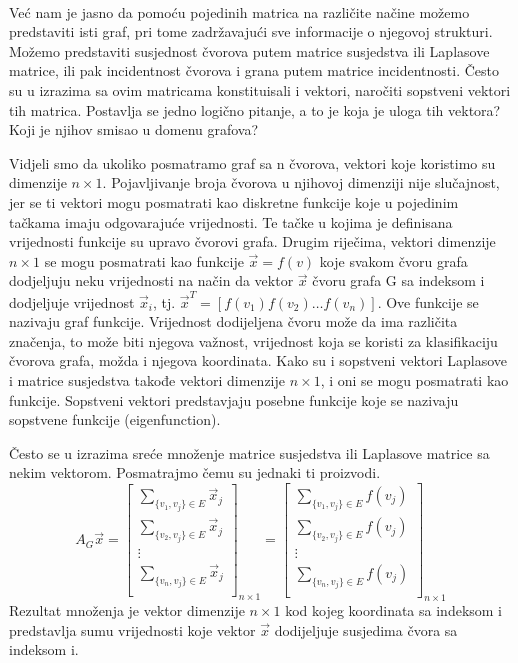 \documentclass[11pt]{article}
\begin{document}
	\paragraph{}
	Već nam je jasno da pomoću pojedinih matrica na različite načine možemo predstaviti isti graf, pri tome zadržavajući sve informacije o njegovoj strukturi. 
    Možemo predstaviti susjednost čvorova putem matrice susjedstva ili Laplasove matrice, ili pak incidentnost čvorova i grana putem matrice incidentnosti.
	Često su u izrazima sa ovim matricama konstituisali i vektori, naročiti sopstveni vektori tih matrica. 
	Postavlja se jedno logično pitanje, a to je koja je uloga tih vektora? Koji je njihov smisao u domenu grafova?
	
	Vidjeli smo da ukoliko posmatramo graf sa n čvorova, vektori koje koristimo su dimenzije $n \times 1$. 
	Pojavljivanje broja čvorova u njihovoj dimenziji nije slučajnost, jer se ti vektori mogu posmatrati kao diskretne funkcije koje
	u pojedinim tačkama imaju odgovarajuće vrijednosti. 
	Te tačke u kojima je definisana vrijednosti funkcije su upravo čvorovi grafa.
	Drugim riječima, vektori dimenzije $n \times 1$ se mogu posmatrati kao funkcije $\vec{x} = f(v)$ koje svakom čvoru grafa dodjeljuju neku vrijednosti na način da vektor $\vec{x}$ čvoru grafa G sa indeksom i dodjeljuje
	vrijednost $\vec{x}_i$, tj. $\vec{x}^T = [ f(v_1) f(v_2) \dots f(v_n)]$. Ove funkcije se nazivaju graf funkcije.
	Vrijednost dodijeljena čvoru može da ima različita značenja, to može biti njegova važnost, vrijednost koja se koristi za klasifikaciju čvorova grafa, možda i njegova koordinata. 
	Kako su i sopstveni vektori Laplasove i matrice susjedstva takođe vektori dimenzije $n \times 1$, i oni se mogu posmatrati kao funkcije. 
	Sopstveni vektori predstavjaju posebne funkcije koje se nazivaju sopstvene funkcije (eigenfunction).

	Često se u izrazima sreće množenje matrice susjedstva ili Laplasove matrice sa nekim vektorom. Posmatrajmo čemu su jednaki ti proizvodi.
	\[
	A_G \vec{x} = 
	\begin{bmatrix}
		\sum_{\{v_1,v_j\} \in E} \vec{x}_j \\
		\sum_{\{v_2,v_j\} \in E} \vec{x}_j \\
		\vdots \\
		\sum_{\{v_n,v_j\} \in E} \vec{x}_j \\
	\end{bmatrix}_{n \times 1} =
	\begin{bmatrix}
		\sum_{\{v_1,v_j\} \in E} f(v_j) \\
		\sum_{\{v_2,v_j\} \in E} f(v_j) \\
		\vdots \\
		\sum_{\{v_n,v_j\} \in E} f(v_j) \\
	\end{bmatrix}_{n \times 1} 
	\]
	Rezultat množenja je vektor dimenzije $n \times 1$ kod kojeg koordinata sa indeksom i predstavlja sumu vrijednosti koje vektor $\vec{x}$ dodijeljuje susjedima čvora sa indeksom i.
	
\end{document}

